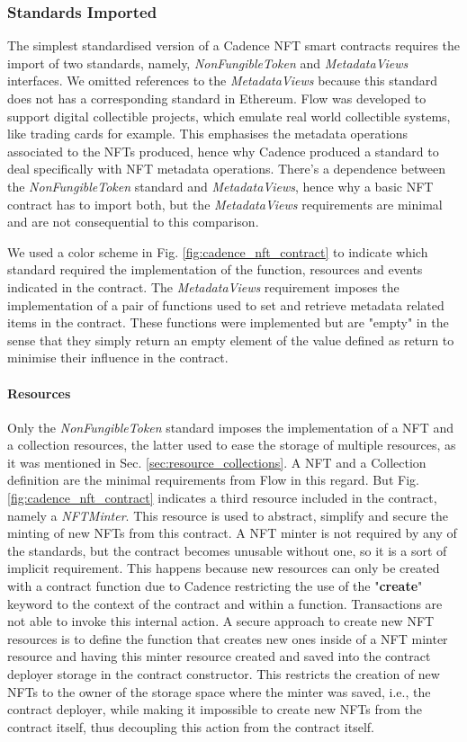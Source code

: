 \documentclass[../NFTComp_IEEE.tex]{subfiles}
\begin{document}
\subsubsection{Standards Imported}
The simplest standardised version of a Cadence NFT smart contracts requires the import of two standards, namely, \textit{NonFungibleToken} and \textit{MetadataViews} interfaces. We omitted references to the \textit{MetadataViews} because this standard does not has a corresponding standard in Ethereum. Flow was developed to support digital collectible projects, which emulate real world collectible systems, like trading cards for example. This emphasises the metadata operations associated to the NFTs produced, hence why Cadence produced a standard to deal specifically with NFT metadata operations. There's a dependence between the \textit{NonFungibleToken} standard and \textit{MetadataViews}, hence why a basic NFT contract has to import both, but the \textit{MetadataViews} requirements are minimal and are not consequential to this comparison.
\par
We used a color scheme in Fig. \ref{fig:cadence_nft_contract} to indicate which standard required the implementation of the function, resources and events indicated in the contract. The \textit{MetadataViews} requirement imposes the implementation of a pair of functions used to set and retrieve metadata related items in the contract. These functions were implemented but are "empty" in the sense that they simply return an empty element of the value defined as return to minimise their influence in the contract.

\paragraph{Resources}
Only the \textit{NonFungibleToken} standard imposes the implementation of a NFT and a collection resources, the latter used to ease the storage of multiple resources, as it was mentioned in Sec. \ref{sec:resource_collections}. A NFT and a Collection definition are the minimal requirements from Flow in this regard. But Fig. \ref{fig:cadence_nft_contract} indicates a third resource included in the contract, namely a \textit{NFTMinter}. This resource is used to abstract, simplify and secure the minting of new NFTs from this contract. A NFT minter is not required by any of the standards, but the contract becomes unusable without one, so it is a sort of implicit requirement. This happens because new resources can only be created with a contract function due to Cadence restricting the use of the "\textbf{create}" keyword to the context of the contract and within a function. Transactions are not able to invoke this internal action. A secure approach to create new NFT resources is to define the function that creates new ones inside of a NFT minter resource and having this minter resource created and saved into the contract deployer storage in the contract constructor. This restricts the creation of new NFTs to the owner of the storage space where the minter was saved, i.e., the contract deployer, while making it impossible to create new NFTs from the contract itself, thus decoupling this action from the contract itself.
\end{document}
